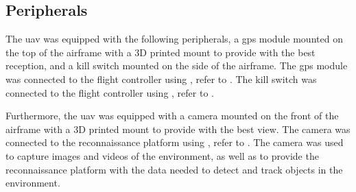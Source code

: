 


\subsection{Peripherals}\label{subsec:implementation_peripherals}

The \gls{uav} was equipped with the following peripherals, a  \gls{gps} module mounted on the top of the airframe with a 3D printed mount to provide with the best reception, and a kill switch mounted on the side of the airframe. The \gls{gps} module was connected to the flight controller using , refer to . The kill switch was connected to the flight controller using , refer to .



Furthermore, the \gls{uav} was equipped with a  camera mounted on the front of the airframe with a 3D printed mount to provide with the best view. The camera was connected to the reconnaissance platform using , refer to . The camera was used to capture images and videos of the environment, as well as to provide the reconnaissance platform with the data needed to detect and track objects in the environment.
